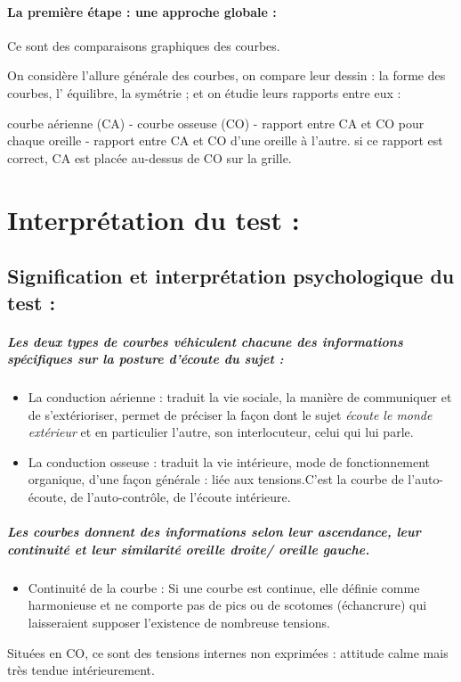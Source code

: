 \paragraph{La première étape : une approche globale : }

Ce sont des comparaisons graphiques des courbes. 

On considère l'allure générale des courbes, on compare leur dessin
: la forme des courbes, l' équilibre, la symétrie ; et on étudie leurs
rapports entre eux : 

courbe aérienne (CA) - courbe osseuse (CO) - rapport entre CA et CO
pour chaque oreille - rapport entre CA et CO d\textquoteright une
oreille à l'autre. si ce rapport est correct, CA est placée au-dessus
de CO sur la grille.
\section{Interprétation du test : }

\subsection{Signification et interprétation psychologique du test : }
\subparagraph{Les deux types de courbes véhiculent chacune des informations spécifiques
sur la posture d'écoute du sujet : }
\begin{itemize}
\item La conduction aérienne : traduit la vie sociale, la manière de communiquer
et de s'extérioriser, permet de préciser la façon dont le sujet\emph{
écoute le monde extérieur} et en particulier l\textquoteright autre,
son interlocuteur, celui qui lui parle. 
\item La conduction osseuse : traduit la vie intérieure, mode de fonctionnement
organique, d'une façon générale : liée aux tensions.C'est la courbe
de l\textquoteright auto-écoute, de l\textquoteright auto-contrôle,
de l'écoute intérieure.
\end{itemize}

\subparagraph{Les courbes donnent des informations selon leur ascendance, leur
continuité et leur similarité oreille droite/ oreille gauche.}
\begin{itemize}
\item Continuité de la courbe : Si une courbe est continue, elle définie
comme harmonieuse et ne comporte pas de pics ou de scotomes (échancrure)  qui laisseraient
supposer l'existence de nombreuse tensions.
\end{itemize}
Situées en CO, ce sont des tensions internes non exprimées : attitude
calme mais très tendue intérieurement.

